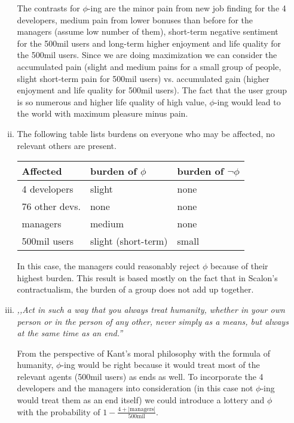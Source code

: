 \documentclass[a4paper, 11pt]{article}
\begin{document}
\begin{enumerate}[a)]
\begin{enumerate}[i)]
        The contrasts for $\phi$-ing are the minor pain from new job finding for the 4 developers, medium pain from lower bonuses than before for the managers (assume low number of them), short-term negative sentiment for the 500mil users and long-term higher enjoyment and life quality for the 500mil users.
        Since we are doing maximization we can consider the accumulated pain (slight and medium pains for a small group of people, slight short-term pain for 500mil users) vs. accumulated gain (higher enjoyment and life quality for 500mil users).
        The fact that the user group is so numerous and higher life quality of high value, $\phi$-ing would lead to the world with maximum pleasure minus pain.
        
        \item
        The following table lists burdens on everyone who may be affected, no relevant others are present.
        
        \begin{tabular}{l|p{5cm}p{5cm}}
        Affected & burden of $\phi$ & burden of $\neg \phi$ \\
        \hline
        4 developers & slight & none \\
        76 other devs. & none & none \\
        managers & medium & none \\
        500mil users & slight (short-term) & small \\
        \end{tabular}
        
        In this case, the managers could reasonably reject $\phi$ because of their highest burden.
        This result is based mostly on the fact that in Scalon's contractualism, the burden of a group does not add up together.
        
        \item

        \emph{,,Act in such a way that you always treat humanity, whether in your own person or in the person of any other, never simply as a means, but always at the same time as an end.''}
        
        From the perspective of Kant's moral philosophy with the formula of humanity, $\phi$-ing would be right because it would treat most of the relevant agents (500mil users) as ends as well.
        To incorporate the 4 developers and the managers into consideration (in this case not $\phi$-ing would treat them as an end itself) we could introduce a lottery and $\phi$ with the probability of $1-\frac{4+|\text{managers}|}{500\text{mil}}$.
    \end{enumerate}
    

\end{enumerate}
\end{document}
